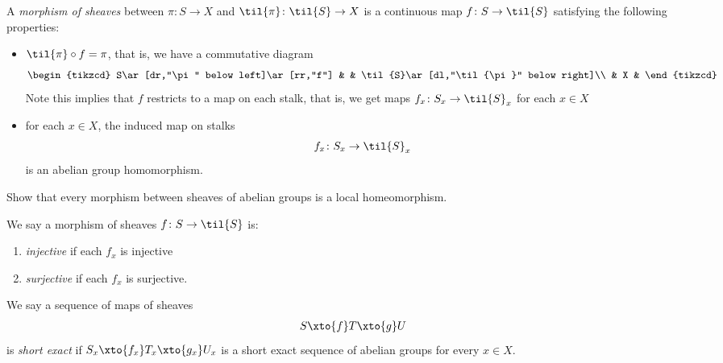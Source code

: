 \documentclass[11pt]{book}
\begin{document}
\begin{definition} A \emph{morphism of sheaves} between $\pi \colon S\to X$ and $\til{\pi} \colon \til{S} \to X$ is a continuous map $f \colon S \to \til{S}$ satisfying the following properties:
\begin{itemize}
    \item $\til{\pi}\circ f = \pi$, that is, we have a commutative diagram
\[ \begin{tikzcd}
    S\ar[dr,"\pi" below left]\ar[rr,"f"] &  & \til{S}\ar[dl,"\til{\pi}" below right]\\
     & X & 
\end{tikzcd} \]
    Note this implies that $f$ restricts to a map on each stalk, that is, we get maps $f_x \colon S_x \to \til{S}_x$ for each $x\in X$
    \item for each $x\in X$, the induced map on stalks
    \begin{align*}
        f_x \colon S_x \to \til{S}_x
    \end{align*}
    is an abelian group homomorphism.
\end{itemize}
\end{definition}

\begin{exercise} Show that every morphism between sheaves of abelian groups is a local homeomorphism.
\end{exercise}



\begin{definition}\label{def:injective-surjective-mononomorphism-of-sheaves} 
We say a morphism of sheaves $f \colon S \to \til{S}$ is:
\begin{enumerate}
    \item \emph{injective} if each $f_x$ is injective
    \item \textit{surjective} if each $f_x$ is surjective.
\end{enumerate}
We say a sequence of maps of sheaves
\begin{align*}
    S \xto{f} T \xto{g} U
\end{align*}
is \emph{short exact} if $S_x \xto{f_x} T_x \xto{g_x} U_x$ is a short exact sequence of abelian groups for every $x\in X$.
\end{definition}
\end{document}
